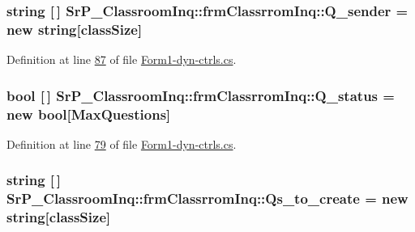 \hypertarget{class_sr_p___classroom_inq_1_1frm_classrrom_inq_afa4b6c4601d48db676d4013daef6624c}{
\subsubsection[{\-Q\-\_\-sender}]{\setlength{\rightskip}{0pt plus 5cm}string \mbox{[}$\,$\mbox{]} {\bf \-Sr\-P\-\_\-\-Classroom\-Inq\-::frm\-Classrrom\-Inq\-::\-Q\-\_\-sender} = new string\mbox{[}{\bf class\-Size}\mbox{]}}}
\label{class_sr_p___classroom_inq_1_1frm_classrrom_inq_afa4b6c4601d48db676d4013daef6624c}


\-Definition at line \hyperlink{_form1-dyn-ctrls_8cs_source_l00087}{87} of file \hyperlink{_form1-dyn-ctrls_8cs_source}{\-Form1-\/dyn-\/ctrls.\-cs}.

\hypertarget{class_sr_p___classroom_inq_1_1frm_classrrom_inq_ae02a7c8f440963717ee0cf2f74d4d56a}{
\subsubsection[{\-Q\-\_\-status}]{\setlength{\rightskip}{0pt plus 5cm}bool \mbox{[}$\,$\mbox{]} {\bf \-Sr\-P\-\_\-\-Classroom\-Inq\-::frm\-Classrrom\-Inq\-::\-Q\-\_\-status} = new bool\mbox{[}{\bf \-Max\-Questions}\mbox{]}}}
\label{class_sr_p___classroom_inq_1_1frm_classrrom_inq_ae02a7c8f440963717ee0cf2f74d4d56a}


\-Definition at line \hyperlink{_form1-dyn-ctrls_8cs_source_l00079}{79} of file \hyperlink{_form1-dyn-ctrls_8cs_source}{\-Form1-\/dyn-\/ctrls.\-cs}.

\hypertarget{class_sr_p___classroom_inq_1_1frm_classrrom_inq_a04ea330233515e3af7d23fcd501364cc}{
\subsubsection[{\-Qs\-\_\-to\-\_\-create}]{\setlength{\rightskip}{0pt plus 5cm}string \mbox{[}$\,$\mbox{]} {\bf \-Sr\-P\-\_\-\-Classroom\-Inq\-::frm\-Classrrom\-Inq\-::\-Qs\-\_\-to\-\_\-create} = new string\mbox{[}{\bf class\-Size}\mbox{]}}}
\label{class_sr_p___classroom_inq_1_1frm_classrrom_inq_a04ea330233515e3af7d23fcd501364cc}


